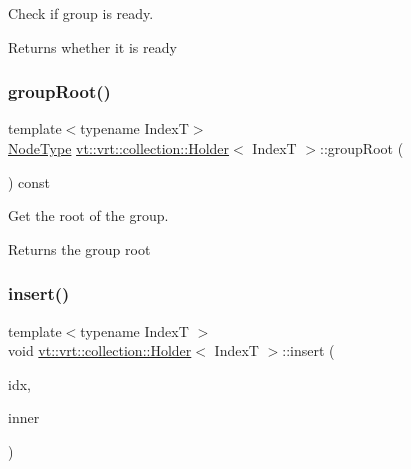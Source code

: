 Check if group is ready. 

\begin{DoxyReturn}{Returns}
whether it is ready 
\end{DoxyReturn}
\mbox{\label{structvt_1_1vrt_1_1collection_1_1_holder_a26b8815a9a424b956e0cde211ea95545}} 
\subsubsection{\texorpdfstring{group\+Root()}{groupRoot()}}
{\footnotesize\ttfamily template$<$typename IndexT$>$ \\
\hyperlink{namespacevt_a866da9d0efc19c0a1ce79e9e492f47e2}{Node\+Type} \hyperlink{structvt_1_1vrt_1_1collection_1_1_holder}{vt\+::vrt\+::collection\+::\+Holder}$<$ IndexT $>$\+::group\+Root (\begin{DoxyParamCaption}{ }\end{DoxyParamCaption}) const\hspace{0.3cm}{\ttfamily [inline]}}



Get the root of the group. 

\begin{DoxyReturn}{Returns}
the group root 
\end{DoxyReturn}
\mbox{\label{structvt_1_1vrt_1_1collection_1_1_holder_a52d7c8a407d20668d84c3a6136b1b5d9}} 
\subsubsection{\texorpdfstring{insert()}{insert()}}
{\footnotesize\ttfamily template$<$typename IndexT $>$ \\
void \hyperlink{structvt_1_1vrt_1_1collection_1_1_holder}{vt\+::vrt\+::collection\+::\+Holder}$<$ IndexT $>$\+::insert (\begin{DoxyParamCaption}\item[{IndexT const \&}]{idx,  }\item[{\hyperlink{structvt_1_1vrt_1_1collection_1_1_holder_a6c93d243ae88f38a8c5f8aa3a1ad86d8}{Inner\+Holder}$<$ IndexT $>$ \&\&}]{inner }\end{DoxyParamCaption})}



